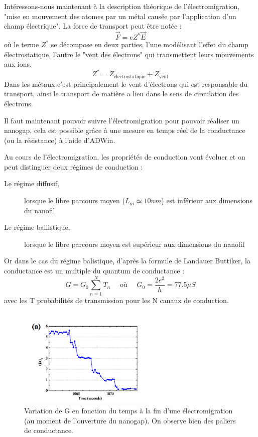 Intéressons-nous maintenant à la description théorique de l'électromigration, "mise en mouvement des atomes par un métal causée par l'application d'un champ électrique". La force de transport peut être notée :
\[\vec{F}=e Z^* \vec{E}\]
où le terme $Z^*$ se décompose en deux parties, l'une modélisant l'effet du champ électrostatique, l'autre le "vent des électrons" qui transmettent leurs mouvements aux ions.
\[Z^* = Z_{\text{electrostatique}} + Z_{\text{vent}}\]
Dans les métaux c'est principalement le vent d'électrons qui est responsable du transport, ainsi le transport de matière a lieu dans le sens de circulation des électrons\cite{10}.\medskip 

Il faut maintenant pouvoir suivre l'électromigration pour pouvoir réaliser un nanogap, cela est possible grâce à une mesure en temps réel de la conductance (ou la résistance) à l'aide d'ADWin.\medskip 

Au cours de l'électromigration, les propriétés de conduction vont évoluer et on peut distinguer deux régimes de conduction :
\begin{description}
    \item[Le régime diffusif,] lorsque le libre parcours moyen ($L_m \simeq 10nm$) est inférieur aux dimensions du nanofil
    \item[Le régime ballistique,] lorsque le libre parcours moyen est supérieur aux dimensions du nanofil
\end{description}

Or dans le cas du régime balistique, d'après la formule de Landauer Buttiker, la conductance est un multiple du quantum de conductance :
\[G = G_0 \sum_{n=1}^N T_n \quad \text{ où } \quad G_0 = \frac{2e^2}{h} = 77.5 \mu S\]
avec les T probabilités de transmission pour les N canaux de conduction.
\begin{figure}[h]
    \begin{center}
        \includegraphics[width=250px]{Images/2_Electromigration_graphe}
        \caption{Variation de G en fonction du temps à la fin d'une électromigration (au moment de l'ouverture du nanogap).
On observe bien des paliers de conductance.}
    \end{center}
\end{figure}

